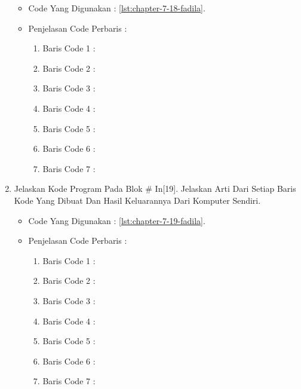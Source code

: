 \begin{enumerate}
\begin{itemize}
\item Code Yang Digunakan : \ref{lst:chapter-7-18-fadila}.

\par
\par
\item Penjelasan Code Perbaris	: 
\begin{enumerate}
\item Baris Code 1	:
\item Baris Code 2	:
\item Baris Code 3	:
\item Baris Code 4	:
\item Baris Code 5	:
\item Baris Code 6	:
\item Baris Code 7	:
\end{enumerate}
\par
\par
\end{itemize}
\par
\par
\par
\item Jelaskan Kode Program Pada Blok \# In[19]. Jelaskan Arti Dari Setiap Baris Kode Yang Dibuat Dan Hasil Keluarannya Dari Komputer Sendiri.
\begin{itemize}
\item Code Yang Digunakan : \ref{lst:chapter-7-19-fadila}.

\par
\par
\item Penjelasan Code Perbaris	: 
\begin{enumerate}
\item Baris Code 1	:
\item Baris Code 2	:
\item Baris Code 3	:
\item Baris Code 4	:
\item Baris Code 5	:
\item Baris Code 6	:
\item Baris Code 7	:
\end{enumerate}
\par
\par
\end{itemize}

\end{enumerate}
